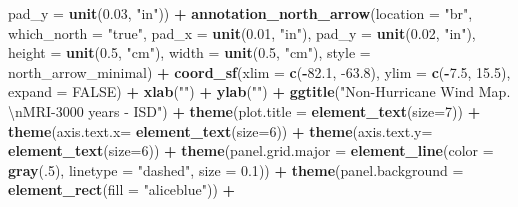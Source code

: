 \documentclass[12pt,oneside]{reedthesis}
\newenvironment{Shaded}{\begin{snugshade}}{\end{snugshade}}
\newcommand{\CharTok}[1]{\textcolor[rgb]{0.31,0.60,0.02}{#1}}
\newcommand{\DataTypeTok}[1]{\textcolor[rgb]{0.13,0.29,0.53}{#1}}
\newcommand{\DecValTok}[1]{\textcolor[rgb]{0.00,0.00,0.81}{#1}}
\newcommand{\FloatTok}[1]{\textcolor[rgb]{0.00,0.00,0.81}{#1}}
\newcommand{\KeywordTok}[1]{\textcolor[rgb]{0.13,0.29,0.53}{\textbf{#1}}}
\newcommand{\NormalTok}[1]{#1}
\newcommand{\OperatorTok}[1]{\textcolor[rgb]{0.81,0.36,0.00}{\textbf{#1}}}
\newcommand{\OtherTok}[1]{\textcolor[rgb]{0.56,0.35,0.01}{#1}}
\newcommand{\StringTok}[1]{\textcolor[rgb]{0.31,0.60,0.02}{#1}}
\begin{document}
\begin{Shaded}
\begin{Highlighting}[]
   \DataTypeTok{pad_y =} \KeywordTok{unit}\NormalTok{(}\FloatTok{0.03}\NormalTok{, }\StringTok{"in"}\NormalTok{)) }\OperatorTok{+}\StringTok{ }
\StringTok{  }\KeywordTok{annotation_north_arrow}\NormalTok{(}\DataTypeTok{location =} \StringTok{"br"}\NormalTok{, }\DataTypeTok{which_north =} \StringTok{"true"}\NormalTok{, }\DataTypeTok{pad_x =} \KeywordTok{unit}\NormalTok{(}\FloatTok{0.01}\NormalTok{, }\StringTok{"in"}\NormalTok{), }\DataTypeTok{pad_y =} \KeywordTok{unit}\NormalTok{(}\FloatTok{0.02}\NormalTok{, }\StringTok{"in"}\NormalTok{), }\DataTypeTok{height =} \KeywordTok{unit}\NormalTok{(}\FloatTok{0.5}\NormalTok{, }\StringTok{"cm"}\NormalTok{), }
   \DataTypeTok{width =} \KeywordTok{unit}\NormalTok{(}\FloatTok{0.5}\NormalTok{, }\StringTok{"cm"}\NormalTok{), }\DataTypeTok{style =}\NormalTok{ north_arrow_minimal) }\OperatorTok{+}
\StringTok{  }\KeywordTok{coord_sf}\NormalTok{(}\DataTypeTok{xlim =} \KeywordTok{c}\NormalTok{(}\OperatorTok{-}\FloatTok{82.1}\NormalTok{, }\FloatTok{-63.8}\NormalTok{), }\DataTypeTok{ylim =} \KeywordTok{c}\NormalTok{(}\OperatorTok{-}\FloatTok{7.5}\NormalTok{, }\FloatTok{15.5}\NormalTok{), }\DataTypeTok{expand =} \OtherTok{FALSE}\NormalTok{) }\OperatorTok{+}
\StringTok{  }\KeywordTok{xlab}\NormalTok{(}\StringTok{""}\NormalTok{) }\OperatorTok{+}\StringTok{ }
\StringTok{  }\KeywordTok{ylab}\NormalTok{(}\StringTok{""}\NormalTok{) }\OperatorTok{+}\StringTok{ }
\StringTok{  }\KeywordTok{ggtitle}\NormalTok{(}\StringTok{"Non-Hurricane Wind Map. }\CharTok{\textbackslash{}n}\StringTok{MRI-3000 years - ISD"}\NormalTok{) }\OperatorTok{+}\StringTok{ }
\StringTok{  }\KeywordTok{theme}\NormalTok{(}\DataTypeTok{plot.title =} \KeywordTok{element_text}\NormalTok{(}\DataTypeTok{size=}\DecValTok{7}\NormalTok{)) }\OperatorTok{+}
\StringTok{  }\KeywordTok{theme}\NormalTok{(}\DataTypeTok{axis.text.x=} \KeywordTok{element_text}\NormalTok{(}\DataTypeTok{size=}\DecValTok{6}\NormalTok{)) }\OperatorTok{+}\StringTok{ }
\StringTok{  }\KeywordTok{theme}\NormalTok{(}\DataTypeTok{axis.text.y=} \KeywordTok{element_text}\NormalTok{(}\DataTypeTok{size=}\DecValTok{6}\NormalTok{)) }\OperatorTok{+}
\StringTok{  }\KeywordTok{theme}\NormalTok{(}\DataTypeTok{panel.grid.major =} \KeywordTok{element_line}\NormalTok{(}\DataTypeTok{color =} \KeywordTok{gray}\NormalTok{(.}\DecValTok{5}\NormalTok{), }\DataTypeTok{linetype =} \StringTok{"dashed"}\NormalTok{, }\DataTypeTok{size =} \FloatTok{0.1}\NormalTok{)) }\OperatorTok{+}
\StringTok{  }\KeywordTok{theme}\NormalTok{(}\DataTypeTok{panel.background =} \KeywordTok{element_rect}\NormalTok{(}\DataTypeTok{fill =} \StringTok{"aliceblue"}\NormalTok{)) }\OperatorTok{+}

\end{Highlighting}
\end{Shaded}
\end{document}
